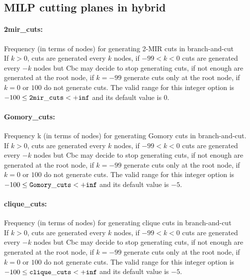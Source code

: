 \subsection{MILP cutting planes in hybrid}
\label{sec:MILP_cutting_planes_in_hybrid}
\paragraph{2mir\_cuts:}\label{sec:2mir_cuts} Frequency (in terms of nodes) for generating 2-MIR cuts in branch-and-cut $\;$ \\
 If $k > 0$, cuts are generated every $k$ nodes,
if $-99 < k < 0$ cuts are generated every $-k$
nodes but Cbc may decide to stop generating cuts,
if not enough are generated at the root node, if
$k=-99$ generate cuts only at the root node, if
$k=0$ or $100$ do not generate cuts. The valid range for this integer option is
$-100 \le {\tt 2mir\_cuts } <  {\tt +inf}$
and its default value is $0$.


\paragraph{Gomory\_cuts:}\label{sec:Gomory_cuts} Frequency k (in terms of nodes) for generating Gomory cuts in branch-and-cut. $\;$ \\
 If $k > 0$, cuts are generated every $k$ nodes,
if $-99 < k < 0$ cuts are generated every $-k$
nodes but Cbc may decide to stop generating cuts,
if not enough are generated at the root node, if
$k=-99$ generate cuts only at the root node, if
$k=0$ or $100$ do not generate cuts. The valid range for this integer option is
$-100 \le {\tt Gomory\_cuts } <  {\tt +inf}$
and its default value is $-5$.


\paragraph{clique\_cuts:}\label{sec:clique_cuts} Frequency (in terms of nodes) for generating clique cuts in branch-and-cut $\;$ \\
 If $k > 0$, cuts are generated every $k$ nodes,
if $-99 < k < 0$ cuts are generated every $-k$
nodes but Cbc may decide to stop generating cuts,
if not enough are generated at the root node, if
$k=-99$ generate cuts only at the root node, if
$k=0$ or $100$ do not generate cuts. The valid range for this integer option is
$-100 \le {\tt clique\_cuts } <  {\tt +inf}$
and its default value is $-5$.


